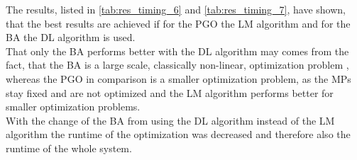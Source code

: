 The results, listed in \autoref{tab:res_timing_6} and \autoref{tab:res_timing_7}, have shown, that the best results are achieved if for the \ac{PGO} the \ac{LM} algorithm and for the \ac{BA} the \ac{DL} algorithm is used.\\

That only the \ac{BA} performs better with the \ac{DL} algorithm may comes from the fact, that the \ac{BA} is a large scale, classically non-linear, optimization problem \cite{Lourakis2005, Triggs2000}, whereas the \ac{PGO} in comparison is a smaller optimization problem, as the \acp{MP} stay fixed and are not optimized and the \ac{LM} algorithm performs better for smaller optimization problems.\\

With the change of the \ac{BA} from using the \ac{DL} algorithm instead of the \ac{LM} algorithm the runtime of the optimization was decreased and therefore also the runtime of the whole system.

